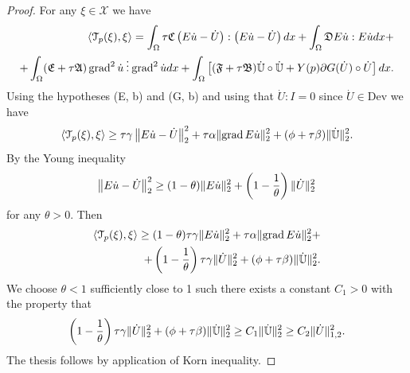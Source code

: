 \begin{proof}
For any $\xi\in\mathscr{X}$ we have
\[
\begin{split}
\langle\mathcal{T}_p(\xi),\xi\rangle=\int_\Omega\tau\mathfrak{C}\left(E\dot u-\dot U\right):\left(E\dot u-\dot U\right)dx+\int_\Omega\mathfrak{D}E\dot u:E\dot udx+\\
+\int_\Omega(\mathfrak{E}+\tau \mathfrak{A})\operatorname{grad}^2\dot u\mathbin{\vdots}\operatorname{grad}^2\dot udx+\int_\Omega\left[(\mathfrak{F}+\tau\mathfrak{B})\mathbb{\dot U}\circ\mathbb{\dot U}+Y(p)\partial G(\dot U)\circ\dot U\right]dx.
\end{split}
\]
Using the hypotheses (E, b) and (G, b) and using that $\dot U:I=0$ since $\dot U\in\text{Dev}$ we have
\[
\langle\mathcal{T}_p(\xi),\xi\rangle\ge\tau\gamma\left\lVert E\dot u-\dot U\right\rVert_2^2+\tau\alpha\lVert\operatorname{grad} E\dot u\rVert_2^2+(\phi+\tau\beta)\lVert\dot{\mathbb{U}}\rVert_2^2.
\]
By the Young inequality
\[
\left\lVert E\dot u-\dot U\right\rVert_2^2\ge(1-\theta)\lVert E\dot u\rVert_2^2+\left(1-\frac{1}{\theta}\right)\lVert\dot U\rVert_2^2
\]
for any $\theta>0$. Then
\[
\begin{split}
\langle\mathcal{T}_p(\xi),\xi\rangle\ge(1-\theta)\tau\gamma\lVert E\dot u\rVert_2^2+\tau\alpha\lVert\operatorname{grad} E\dot u\rVert_2^2+\\
+\left(1-\frac{1}{\theta}\right)\tau\gamma\lVert\dot U\rVert_2^2+(\phi+\tau\beta)\lVert\dot{\mathbb{U}}\rVert_2^2.
\end{split}
\]
We choose $\theta<1$ sufficiently close to 1 such there exists a constant $C_1>0$ with the property that
\[
\left(1-\frac{1}{\theta}\right)\tau\gamma\lVert\dot U\rVert_2^2+(\phi+\tau\beta)\lVert\dot{\mathbb{U}}\rVert_2^2\ge C_1\lVert\dot{\mathbb{U}}\rVert_2^2\ge C_2\lVert\dot U\rVert_{1,2}^2.
\]
The thesis follows by application of Korn inequality.
\end{proof}
